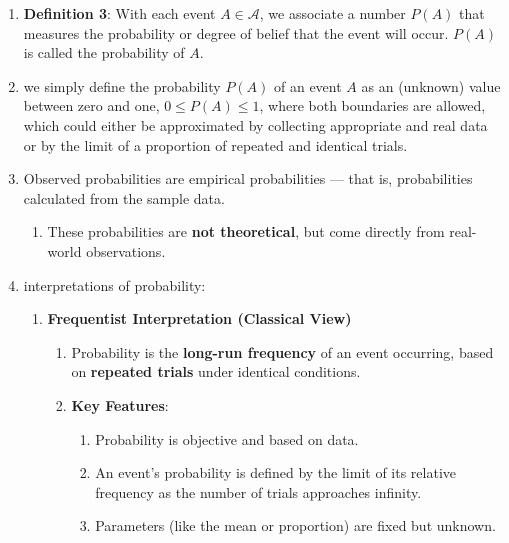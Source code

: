 \begin{enumerate}
    \item \textbf{Definition 3}: With each event $A \in \mathcal{A}$, we associate a number $P (A)$ that measures the probability or degree of belief that the event will occur. 
    $P (A)$ is called the probability of $A$. 
    \hfill \cite{mfml/book/mml/Deisenroth-Faisal-Ong}

    \item we simply define the probability $P(A)$ of an event $A$ as an (unknown) value between zero and one, $0 \leq P (A) \leq 1$, where both boundaries are allowed, which could either be approximated by collecting appropriate and real data or by the limit of a proportion of repeated and identical trials.
    \hfill \cite{statistics/book/Statistics-for-Data-Scientists/Maurits-Kaptein}

    \item
    \begin{definition}
        Observed probabilities are empirical probabilities — that is, probabilities calculated from the sample data.
    \end{definition}
    \begin{enumerate}
        \item These probabilities are \textbf{not theoretical}, but come directly from real-world observations.
    \end{enumerate}

    \item interpretations of probability:
    \begin{enumerate}
        \item \textbf{Frequentist Interpretation (Classical View)}
        \begin{enumerate}
            \item Probability is the \textbf{long-run frequency} of an event occurring, based on \textbf{repeated trials} under identical conditions.

            \item \textbf{Key Features}:
            \begin{enumerate}
                \item Probability is objective and based on data.

                \item An event's probability is defined by the limit of its relative frequency as the number of trials approaches infinity.

                \item Parameters (like the mean or proportion) are fixed but unknown.


\end{enumerate}
\end{enumerate}
\end{enumerate}
\end{enumerate}
